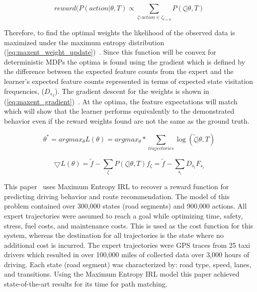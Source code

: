\documentclass[12pt,american]{report}
\begin{document}
\begin{equation}
            \label{eq:stochastic_policy}
            reward(P(action | \theta, T) \propto \sum_{\zeta:action\in\zeta_{t=0}}^{}P(\zeta | \theta, T)%
        \end{equation}

Therefore, to find the optimal weights the likelihood of the observed data is maximized under the maximum entropy distribution (\ref{eq:maxent_weight_update})~\cite{ziebart2008maximum}. Since this function will be convex for deterministic MDPs the optima is found using the gradient  which is defined by the difference between the expected feature counts from the expert and the learner's expected feature counts represented in terms of expected state visitation frequencies, (${{}D_s}_{i}$).  The gradient descent for the weights is shown in (\ref{eq:maxent_gradient})~\cite{ziebart2008maximum}. At the optima, the feature expectations will match which will show that the learner performs equivalently to the demonstrated behavior even if the reward weights found are not the same as the ground truth.

\begin{equation}
            \label{eq:maxent_weight_update}
            \theta^* = argmax_\theta L(\theta) = argmax_\theta * \sum_{trajectories}^{}\log(\tilde\zeta|\theta,T)%
        \end{equation}

\begin{equation}
            \label{eq:maxent_gradient}
            \bigtriangledown L(\theta) = \tilde f - \sum_{\zeta}^{} P(\zeta|\theta,T)f_\zeta = \tilde f - \sum_{s_i}^{}D_{s_{i}}F_{s_{i}}%
        \end{equation}

This paper~\cite{ziebart2008maximum} uses Maximum Entropy IRL to recover a reward function for predicting driving behavior and route recommendation. The model of this problem contained over 300,000 states (road segments) and 900,000 actions. All expert trajectories were assumed to reach a goal while optimizing time, safety, stress, fuel costs, and maintenance costs. This is used as the cost function for this system, whereas the destination for all trajectories is the state where no additional cost is incurred. The expert trajectories were GPS traces from 25 taxi drivers which resulted in over 100,000 miles of collected data over 3,000 hours of driving. Each state (road segment) was characterized by: road type, speed, lanes, and transitions. Using the Maximum Entropy IRL model this paper achieved state-of-the-art results for its time for path matching.
\end{document}
